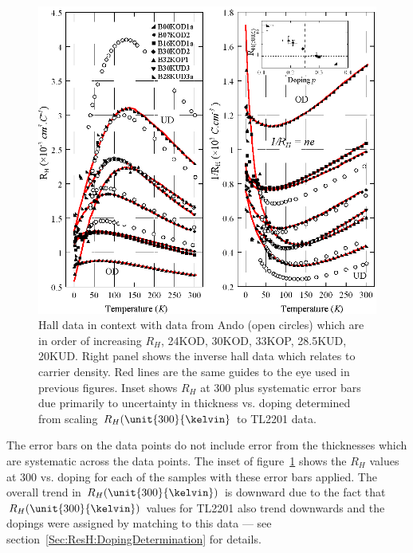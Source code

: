 \begin{figure}[htbp]
	\begin{center}
		\includegraphics[scale=1.1]{Chapter-HallBSCO/Figures/InvHallCombined/InvHallCombined}
		\caption{Hall data in context with data from Ando \etal\cite{Ando1999} (open circles) which are in order of increasing $R_H$, 24KOD, 30KOD, 33KOP, 28.5KUD, 20KUD. Right panel shows the inverse hall data which relates to carrier density. Red lines are the same guides to the eye used in previous figures. Inset shows $R_H$ at \unit{300}{\kelvin} plus systematic error bars due primarily to uncertainty in thickness vs. doping determined from scaling $R_H(\unit{300}{\kelvin}$ to \ac{TL2201} data.}
		\label{Fig:ResH:InvHallCombined}
	\end{center}
\end{figure}

The error bars on the data points do not include error from the thicknesses which are systematic across the data points. The inset of figure~\ref{Fig:ResH:InvHallCombined} shows the $R_H$ values at \unit{300}{\kelvin} vs. doping for each of the samples with these error bars applied. The overall trend in $R_H(\unit{300}{\kelvin})$ is downward due to the fact that $R_H(\unit{300}{\kelvin})$ values for \ac{TL2201} also trend downwards and the dopings were assigned by matching to this data --- see section~\ref{Sec:ResH:DopingDetermination} for details.

